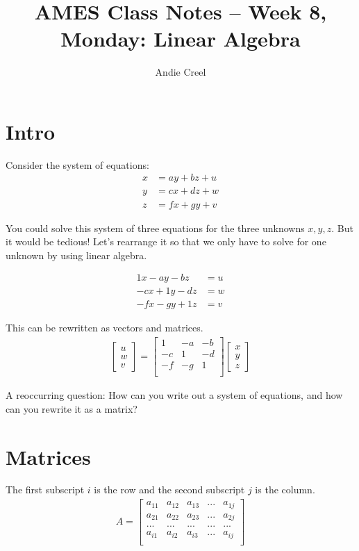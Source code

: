 \documentclass{article}
\title{AMES Class Notes -- Week 8, Monday: Linear Algebra}
\author{Andie Creel}
\begin{document}
\maketitle

\section{Intro}

Consider the system of equations: 
\begin{align}
    x &= ay + bz + u \\
    y &= cx + dz + w \\
    z &= fx + gy + v
\end{align}

You could solve this system of three equations for the three unknowns $x,y,z$. But it would be tedious! Let's rearrange it so that we only have to solve for one unknown by using linear algebra. 

\begin{align}
    1x - ay - bz &= u \\
    -cx + 1y - dz &= w \\
    -f x -gy +1z &= v 
\end{align}

This can be rewritten as vectors and matrices. 
\begin{align}
    \begin{bmatrix}
        u \\
        w \\
        v
    \end{bmatrix} = 
    \begin{bmatrix}
        1 & -a & -b \\
        -c & 1 & -d \\
        -f &  -g & 1 \\
    \end{bmatrix} 
    \begin{bmatrix}
        x \\
        y\\
        z
    \end{bmatrix}
\end{align}

A reoccurring question: How can you write out a system of equations, and how can you rewrite it as a matrix?

\section{Matrices}
The first subscript $i$ is the row and the second subscript $j$ is the column.
\begin{align}
    A = \begin{bmatrix}
        a_{11} & a_{12} & a_{13} & ... & a_{1j}\\
        a_{21} & a_{22} & a_{23} & ... & a_{2j}\\
        ... & ... & ... & ... & ... \\
        a_{i1} & a_{i2} & a_{i3} & ... & a_{ij}\\
    \end{bmatrix}
\end{align}
\end{document}
